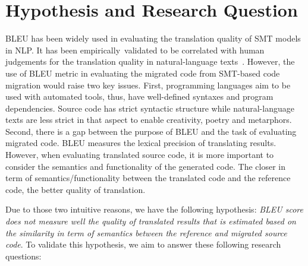 \section{Hypothesis and Research Question}

BLEU has been widely used in evaluating the translation quality of SMT
models in NLP. It has been empirically~validated to be correlated with
human judgements for the translation quality in natural-language
texts~\cite{Papineni2002}.
%
%
However, the use of BLEU metric in evaluating the migrated code from
SMT-based code migration would raise two key issues. First,
programming languages aim to be used with automated tools, thus, have
well-defined syntaxes and program dependencies. Source code has strict syntactic
structure while natural-language texts are less strict in that aspect
to enable creativity, poetry and metarphors.
%
%
Second, there is a gap between the purpose of BLEU and the task of
evaluating migrated code. BLEU measures the lexical precision of
translating results. However, when evaluating translated source code,
it is more important to consider the semantics and functionality of
the generated code.
%
The closer in term of semantics/functionality between the translated
code and the reference code, the better quality of
translation.
%

Due to those two intuitive reasons, we have the following hypothesis:
{\em BLEU score does not measure well the quality of translated results
that is estimated based on the similarity in term of 
semantics between the reference and migrated source code}. To validate 
this hypothesis, we aim to answer these following research questions:
%

